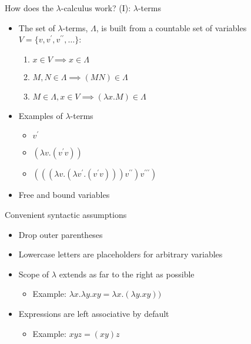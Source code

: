 \documentclass{beamer}
\begin{document}
\begin{frame}{How does the $\lambda$-calculus work? (I): $\lambda$-terms}
\begin{itemize}
\item The set of $\lambda$-terms, $\Lambda$, is built from a countable set of variables $V = \{v, v^\prime, v^{\prime\prime}, \ldots\}$:
\begin{enumerate}
\item $x \in V \implies x \in \Lambda$
\item $M,N \in \Lambda \implies (MN) \in \Lambda$
\item $M \in \Lambda, x\in V \implies (\lambda x . M) \in \Lambda$
\end{enumerate}
\item{Examples of $\lambda$-terms}
\begin{itemize}
\item $v^\prime$
\item $(\lambda v. (v^\prime v))$
\item $(((\lambda v. (\lambda v^\prime . (v^\prime v))) v^{\prime\prime}) v^{\prime\prime\prime})$
\end{itemize}
\item Free and bound variables
\end{itemize}
\end{frame}

\begin{frame}{Convenient syntactic assumptions}
\begin{itemize}
\item Drop outer parentheses
\item Lowercase letters are placeholders for arbitrary variables
\item Scope of $\lambda$ extends as far to the right as possible
\begin{itemize}
\item Example: $\lambda x . \lambda y . x y = \lambda x . (\lambda y . x y))$
\end{itemize}
\item Expressions are left associative by default
\begin{itemize}
\item Example: $xyz = (x y) z$
\end{itemize}
\end{itemize}
\end{frame}
\end{document}
